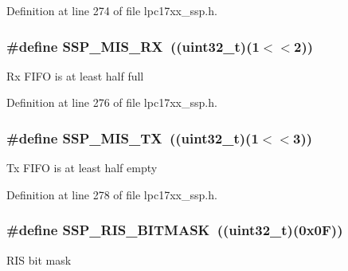 \-Definition at line 274 of file lpc17xx\-\_\-ssp.\-h.

\hypertarget{group___s_s_p___private___macros_gaae1efd94a8b66679f1793a3c5458a777}{
\subsubsection[{\-S\-S\-P\-\_\-\-M\-I\-S\-\_\-\-R\-X}]{\setlength{\rightskip}{0pt plus 5cm}\#define {\bf \-S\-S\-P\-\_\-\-M\-I\-S\-\_\-\-R\-X}~((uint32\-\_\-t)(1$<$$<$2))}}\label{group___s_s_p___private___macros_gaae1efd94a8b66679f1793a3c5458a777}
\-Rx \-F\-I\-F\-O is at least half full 

\-Definition at line 276 of file lpc17xx\-\_\-ssp.\-h.

\hypertarget{group___s_s_p___private___macros_ga1db3ebd72dfe222733297a3fb5ca37af}{
\subsubsection[{\-S\-S\-P\-\_\-\-M\-I\-S\-\_\-\-T\-X}]{\setlength{\rightskip}{0pt plus 5cm}\#define {\bf \-S\-S\-P\-\_\-\-M\-I\-S\-\_\-\-T\-X}~((uint32\-\_\-t)(1$<$$<$3))}}\label{group___s_s_p___private___macros_ga1db3ebd72dfe222733297a3fb5ca37af}
\-Tx \-F\-I\-F\-O is at least half empty 

\-Definition at line 278 of file lpc17xx\-\_\-ssp.\-h.

\hypertarget{group___s_s_p___private___macros_gaaf0114701def5c9b0e291cdf29fab22d}{
\subsubsection[{\-S\-S\-P\-\_\-\-R\-I\-S\-\_\-\-B\-I\-T\-M\-A\-S\-K}]{\setlength{\rightskip}{0pt plus 5cm}\#define {\bf \-S\-S\-P\-\_\-\-R\-I\-S\-\_\-\-B\-I\-T\-M\-A\-S\-K}~((uint32\-\_\-t)(0x0\-F))}}\label{group___s_s_p___private___macros_gaaf0114701def5c9b0e291cdf29fab22d}
\-R\-I\-S bit mask 

